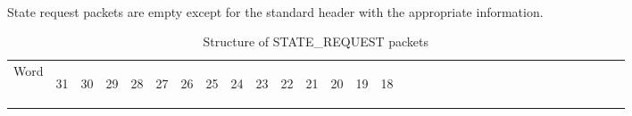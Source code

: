 \documentclass[11pt]{article}
\begin{document}
\paragraph{}
State request packets are empty except for the standard header with the appropriate information.
\newline
\begin{table}[h!]
    \centering
    \label{tab:stateReqestDef}
    \caption{Structure of STATE\_REQUEST packets}
    \begin{tabular}{|p{1cm}|m{0.04cm}|m{0.04cm}|m{0.04cm}|m{0.04cm}|m{0.04cm}|m{0.04cm}|m{0.04cm}|m{0.04cm}|m{0.04cm}|
        m{0.04cm}|m{0.04cm}|m{0.04cm}|m{0.04cm}|m{0.04cm}|m{0.04cm}|m{0.04cm}|m{0.04cm}|m{0.04cm}|m{0.04cm}|m{0.04cm}|
        m{0.04cm}|m{0.04cm}|m{0.04cm}|m{0.04cm}|m{0.04cm}|m{0.04cm}|m{0.04cm}|m{0.04cm}|m{0.04cm}|m{0.04cm}|m{0.04cm}|m{0.04cm}|}
        \hline
        Word & 
        \begin{sideways}31\end{sideways} &
        \begin{sideways}30\end{sideways} & 
        \begin{sideways}29\end{sideways} &
        \begin{sideways}28\end{sideways} &
        \begin{sideways}27\end{sideways} &
        \begin{sideways}26\end{sideways} &
        \begin{sideways}25\end{sideways} &
        \begin{sideways}24\end{sideways} &
        \begin{sideways}23\end{sideways} &
        \begin{sideways}22\end{sideways} &
        \begin{sideways}21\end{sideways} &
        \begin{sideways}20\end{sideways} &
        \begin{sideways}19\end{sideways} &
        \begin{sideways}18\end{sideways} &

\end{tabular}
\end{table}
\end{document}
